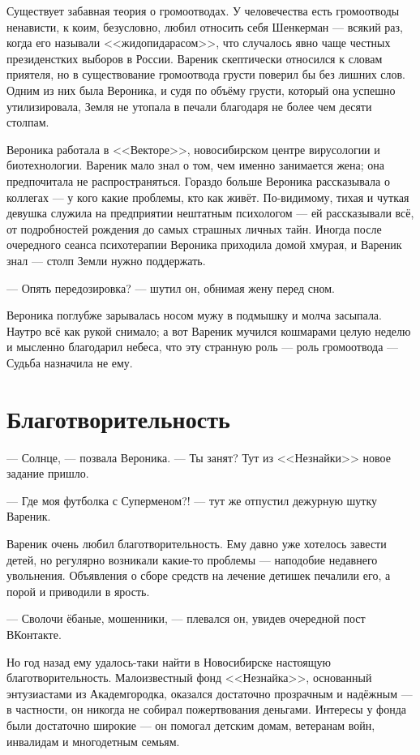\documentclass[a4paper,10pt,fleqn]{book}\usepackage{polyglossia}\setdefaultlanguage{english}\setotherlanguage{russian}\defaultfontfeatures{Ligatures=TeX,Mapping=tex-text} \usepackage{xcolor}\definecolor{lightgray}{HTML}{bbbbbb}\color{lightgray}\newcommand{\ml}[3]{\textcolor{black}{#3}}
\begin{document}
Существует забавная теория о громоотводах.
У человечества есть громоотводы ненависти, к коим, безусловно, любил относить себя Шенкерман --- всякий раз, когда его называли <<жидопидарасом>>, что случалось явно чаще честных президенстких выборов в России.
Вареник скептически относился к словам приятеля, но в существование громоотвода грусти поверил бы без лишних слов.
Одним из них была Вероника, и судя по объёму грусти, который она успешно утилизировала, Земля не утопала в печали благодаря не более чем десяти столпам.

Вероника работала в <<Векторе>>, новосибирском центре вирусологии и биотехнологии.
Вареник мало знал о том, чем именно занимается жена;
она предпочитала не распространяться.
Гораздо больше Вероника рассказывала о коллегах --- у кого какие проблемы, кто как живёт.
По-видимому, тихая и чуткая девушка служила на предприятии нештатным психологом --- ей рассказывали всё, от подробностей рождения до самых страшных личных тайн.
Иногда после очередного сеанса психотерапии Вероника приходила домой хмурая, и Вареник знал --- столп Земли нужно поддержать.

--- Опять передозировка? --- шутил он, обнимая жену перед сном.

Вероника поглубже зарывалась носом мужу в подмышку и молча засыпала.
Наутро всё как рукой снимало;
а вот Вареник мучился кошмарами целую неделю и мысленно благодарил небеса, что эту странную роль --- роль громоотвода --- Судьба назначила не ему.

\section{Благотворительность}

--- Солнце, --- позвала Вероника.
--- Ты занят?
Тут из <<Незнайки>> новое задание пришло.

--- Где моя футболка с Суперменом?! --- тут же отпустил дежурную шутку Вареник.

Вареник очень любил благотворительность.
Ему давно уже хотелось завести детей, но регулярно возникали какие-то проблемы --- наподобие недавнего увольнения.
Объявления о сборе средств на лечение детишек печалили его, а порой и приводили в ярость.

--- Сволочи ёбаные, мошенники, --- плевался он, увидев очередной пост ВКонтакте.

Но год назад ему удалось-таки найти в Новосибирске настоящую благотворительность.
Малоизвестный фонд <<Незнайка>>, основанный энтузиастами из Академгородка, оказался достаточно прозрачным и надёжным --- в частности, он никогда не собирал пожертвования деньгами.
Интересы у фонда были достаточно широкие --- он помогал детским домам, ветеранам войн, инвалидам и многодетным семьям.
\end{document}
